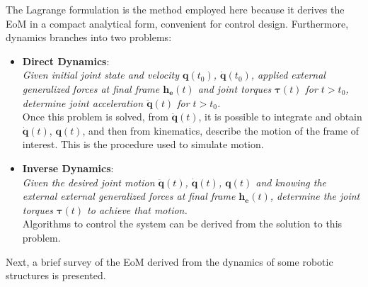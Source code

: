 The Lagrange formulation is the method employed here because it derives the EoM in a compact analytical form, convenient for control design.  
Furthermore, dynamics branches into two problems: 
\begin{itemize}
    \item \textbf{Direct Dynamics}:\\
    \textit{Given initial joint state and velocity $\mathbf{q}(t_0)$, $\mathbf{\dot{q}}(t_0)$, applied external generalized forces at final frame $\mathbf{h_e}(t)$ and joint torques $\mathbf{\tau}(t)$ for $t>t_0$, determine joint acceleration $\mathbf{\ddot{q}}(t)$ for $t>t_0$.}\\
    Once this problem is solved, from $\mathbf{\ddot{q}}(t)$, it is possible to integrate and obtain $\mathbf{\dot{q}}(t)$, $\mathbf{q}(t)$, and then from kinematics, describe the motion of the frame of interest. This is the procedure used to simulate motion.  
    \item \textbf{Inverse Dynamics}: \\
    \textit{Given the desired joint motion $\mathbf{\ddot{q}}(t)$, $\mathbf{\dot{q}}(t)$, $\mathbf{q}(t)$ and knowing the external external generalized forces at final frame  $\mathbf{h_e}(t)$, determine the joint torques $\mathbf{\tau}(t)$ to achieve that motion.}\\
    Algorithms to control the system can be derived from the solution to this problem\cite{SurveyQuadrupeds}.    
\end{itemize}

Next, a brief survey of the EoM derived from the dynamics of some robotic structures is presented.

